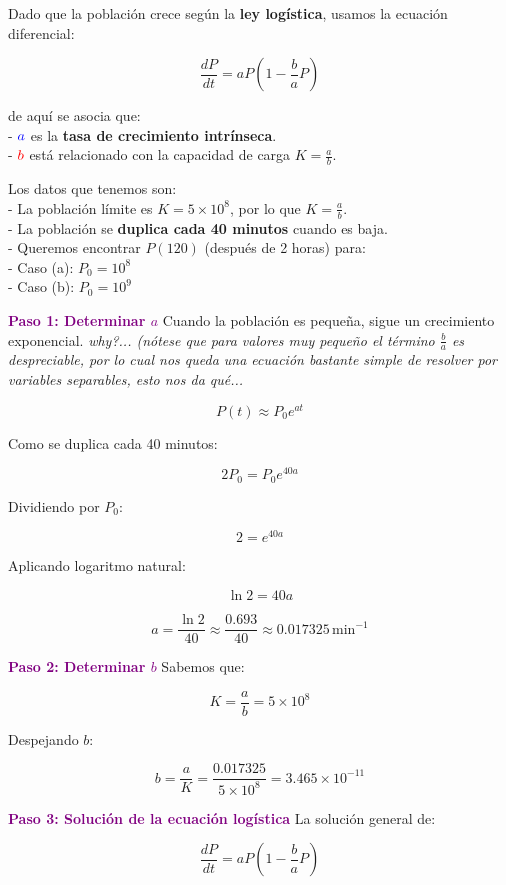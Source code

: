\documentclass{article}
\begin{document}
Dado que la población crece según la \textbf{ley logística}, usamos la ecuación diferencial:

\[
\frac{dP}{dt} = a P \left( 1 - \frac{b}{a} P \right)
\]

de aquí se asocia que:\\
- \( \textcolor{blue}{a} \) es la \textbf{tasa de crecimiento intrínseca}.\\
- \( \textcolor{red}{b} \) está relacionado con la capacidad de carga \( K = \frac{a}{b} \).

Los datos que tenemos son:\\
- La población límite es \( K = 5 \times 10^8 \), por lo que \( K = \frac{a}{b} \).\\
- La población se \textbf{duplica cada 40 minutos} cuando es baja.\\
- Queremos encontrar \( P(120) \) (después de 2 horas) para:\\
  - Caso (a): \( P_0 = 10^8 \)\\
  - Caso (b): \( P_0 = 10^9 \)

\textcolor{purple}{\textbf{Paso 1: Determinar \( a \)}}  
Cuando la población es pequeña, sigue un crecimiento exponencial. \qquad \textit{why?... (nótese que para valores muy pequeño el término $\frac{b}{a}$ es despreciable, por lo cual nos queda una ecuación bastante simple de resolver por variables separables, esto nos da qué...}

\[
P(t) \approx P_0 e^{a t}
\]

Como se duplica cada 40 minutos:

\[
2 P_0 = P_0 e^{40a}
\]

Dividiendo por \( P_0 \):

\[
2 = e^{40a}
\]

Aplicando logaritmo natural:

\[
\ln 2 = 40a
\]

\[
a = \frac{\ln 2}{40} \approx \frac{0.693}{40} \approx 0.017325 \, \text{min}^{-1}
\]

\textcolor{purple}{\textbf{Paso 2: Determinar \( b \)}}  
Sabemos que:

\[
K = \frac{a}{b} = 5 \times 10^8
\]

Despejando \( b \):

\[
b = \frac{a}{K} = \frac{0.017325}{5 \times 10^8} = 3.465 \times 10^{-11}
\]

\textcolor{purple}{\textbf{Paso 3: Solución de la ecuación logística}}  
La solución general de:

\[
\frac{dP}{dt} = a P \left( 1 - \frac{b}{a} P \right)
\]
\end{document}
